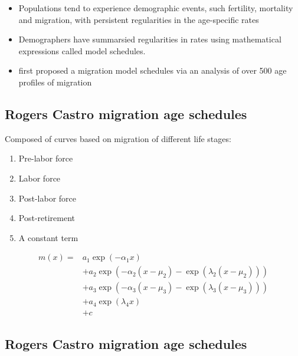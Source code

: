\documentclass[
]{book}
\providecommand{\tightlist}{%
  \setlength{\itemsep}{0pt}\setlength{\parskip}{0pt}}
\begin{document}
\begin{itemize}
\tightlist
\item
  Populations tend to experience demographic events, such fertility, mortality and migration, with persistent regularities in the age-specific rates
\item
  Demographers have summarsied regularities in rates using mathematical expressions called model schedules.
\item
  \citet{Rogers1981} first proposed a migration model schedules via an analysis of over 500 age profiles of migration
\end{itemize}

\hypertarget{rogers-castro-migration-age-schedules-1}{%
\subsection{Rogers Castro migration age schedules}\label{rogers-castro-migration-age-schedules-1}}

Composed of curves based on migration of different life stages:

\begin{enumerate}
\def\labelenumi{\arabic{enumi}.}
\tightlist
\item
  Pre-labor force
\item
  Labor force
\item
  Post-labor force
\item
  Post-retirement
\item
  A constant term
\end{enumerate}

\[
\begin{aligned}
m(x) =& a_1 \exp(-\alpha_1 x)  \\
&+a_2 \exp(-\alpha_2(x - \mu_2) - \exp(\lambda_2(x - \mu_2)))  \\
&+a_3 \exp(-\alpha_3(x - \mu_3) - \exp(\lambda_3(x - \mu_3)))  \\
&+a_4 \exp(\lambda_4x)\\
&+ c
\end{aligned}
\]

\hypertarget{rogers-castro-migration-age-schedules-2}{%
\subsection{Rogers Castro migration age schedules}\label{rogers-castro-migration-age-schedules-2}}

\centering
\end{document}
